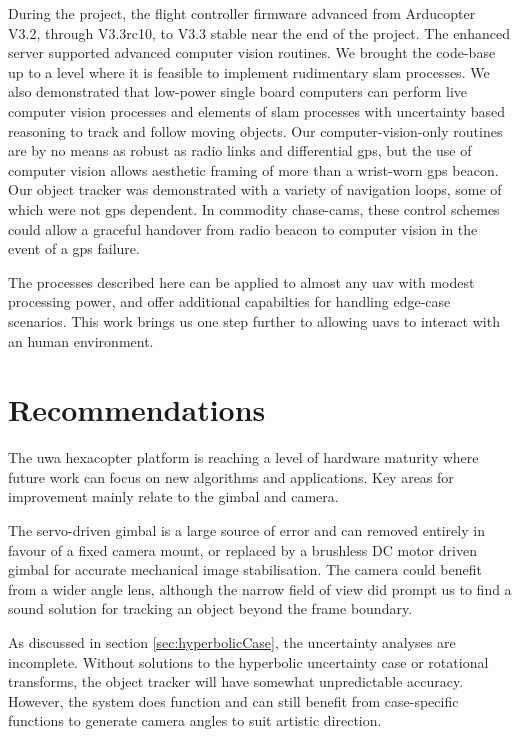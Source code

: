 \documentclass[a4paper, 11pt, titlepage]{article}
\begin{document}
During the project, the flight controller firmware advanced from Arducopter V3.2, through V3.3rc10, to V3.3 stable near the end of the project.
The enhanced server supported advanced computer vision routines.
We brought the code-base up to a level where it is feasible to implement rudimentary \gls{slam} processes.
We also demonstrated that low-power single board computers can perform live computer vision processes and elements of \gls{slam} processes with uncertainty based reasoning to track and follow moving objects.
Our computer-vision-only routines are by no means as robust as radio links and differential \gls{gps}, but the use of computer vision allows aesthetic framing of more than a wrist-worn \gls{gps} beacon.
Our object tracker was demonstrated with a variety of navigation loops, some of which were not \gls{gps} dependent. In commodity chase-cams, these control schemes could allow a graceful handover from radio beacon to computer vision in the event of a \gls{gps} failure.

The processes described here can be applied to almost any \gls{uav} with modest processing power, and offer additional capabilties for handling edge-case scenarios.
This work brings us one step further to allowing \glspl{uav} to interact with an human environment.



\section{Recommendations}

  The \gls{uwa} hexacopter platform is reaching a level of hardware maturity where future work can focus on new algorithms and applications.  Key areas for improvement mainly relate to the gimbal and camera.

  The servo-driven gimbal is a large source of error and can removed entirely in favour of a fixed camera mount, or replaced by a brushless DC motor driven gimbal for accurate mechanical image stabilisation.  The camera could benefit from a wider angle lens, although the narrow field of view did prompt us to find a sound solution for tracking an object beyond the frame boundary.

  As discussed in section \ref{sec:hyperbolicCase}, the uncertainty analyses are incomplete.
  Without solutions to the hyperbolic uncertainty case or rotational transforms, the object tracker will have somewhat unpredictable accuracy.  However, the system does function and can still benefit from case-specific functions to generate camera angles to suit artistic direction.
\end{document}
